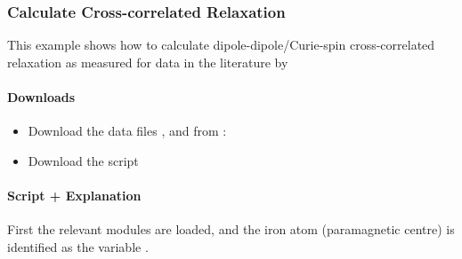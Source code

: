 \documentclass[a4paper,10pt,english]{sphinxmanual}
\begin{document}
\subsubsection{Calculate Cross-correlated Relaxation}
\label{\detokenize{examples/ccr_calculate:calculate-cross-correlated-relaxation}}\label{\detokenize{examples/ccr_calculate:ccr-calculate}}\label{\detokenize{examples/ccr_calculate::doc}}
This example shows how to calculate dipole-dipole/Curie-spin cross-correlated relaxation as measured for data in the literature by 


\paragraph{Downloads}
\label{\detokenize{examples/ccr_calculate:downloads}}\begin{itemize}
\item {} 
Download the data files ,  and  from :

\item {} 
Download the script 

\end{itemize}


\paragraph{Script + Explanation}
\label{\detokenize{examples/ccr_calculate:script-explanation}}
First the relevant modules are loaded, and the iron atom (paramagnetic centre) is identified as the variable .

%
\begin{sphinxVerbatim}[commandchars=\\\{\}]
      
   

  
  \PYG{p}{[}\PYG{p}{]}\PYG{p}{[}\PYG{p}{]}\PYG{p}{[}\PYG{p}{]}\PYG{p}{[}\PYG{p}{]}
\end{sphinxVerbatim}
\end{document}
